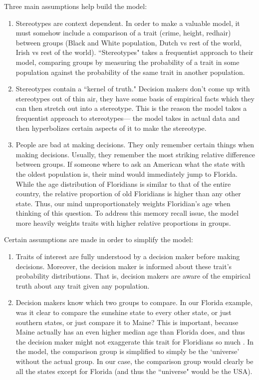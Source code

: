 \documentclass[12pt]{article}
\theoremstyle{definition}
\numberwithin{equation}{section}
\begin{document}
\begin{flushleft}
Three main assumptions help build the model:
\begin{enumerate}
    \item Stereotypes are context dependent. In order to make a valuable model, it must somehow include a comparison of a trait (crime, height, redhair) between groups (Black and White population, Dutch vs rest of the world, Irish vs rest of the world). ``Stereotypes" takes a frequentist approach to their model, comparing groups by measuring the probability of a trait in some population against the probability of the same trait in another population. 
    \item Stereotypes contain a ``kernel of truth." Decision makers don't come up with stereotypes out of thin air, they have some basis of empirical facts which they can then stretch out into a stereotype. This is the reason the model takes a frequentist approach to stereotypes--- the model takes in actual data and then hyperbolizes certain aspects of it to make the stereotype.
    \item People are bad at making decisions. They only remember certain things when making decisions. Usually, they remember the most striking relative difference between groups. If someone where to ask an American what the state with the oldest population is, their mind would immediately jump to Florida. While the age distribution of Floridians is similar to that of the entire country, the relative proportion of old Floridians is higher than any other state. Thus, our mind unproportionately weights Floridian's age when thinking of this question. To address this memory recall issue, the model more heavily weights traits with higher relative proportions in groups. 
\end{enumerate}
Certain assumptions are made in order to simplify the model:
\begin{enumerate}
    \item Traits of interest are fully understood by a decision maker before making decisions. Moreover, the decision maker is informed about these trait's probability distributions. That is, decision makers are aware of the empirical truth about any trait given any population. 
    \item Decision makers know which two groups to compare. In our Florida example, was it clear to compare the sunshine state to every other state, or just southern states, or just compare it to Maine? This is important, because Maine actually has an even higher median age than Florida does, and thus the decision maker might not exaggerate this trait for Floridians so much \cite{MedianAge}. In the model, the comparison group is simplified to simply be the `universe' without the actual group. In our case, the comparison group would clearly be all the states except for Florida (and thus the ``universe" would be the USA).

\end{enumerate}
\end{flushleft}
\end{document}
